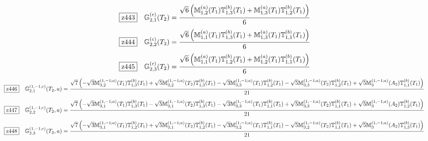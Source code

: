 \documentclass[fleqn,10pt,landscape]{jsarticle}
\begin{document}
\begin{dmath*}
\hspace*{3mm}\fbox{z443}\quad \mathbb{G}_{2,1}^{(c)}(T_{2})=\frac{\sqrt{6} \left(\mathbb{M}_{1,2}^{(a)}(T_{1}) \mathbb{T}_{1,3}^{(b)}(T_{1}) + \mathbb{M}_{1,3}^{(a)}(T_{1}) \mathbb{T}_{1,2}^{(b)}(T_{1})\right)}{6}
\end{dmath*}
\begin{dmath*}
\hspace*{3mm}\fbox{z444}\quad \mathbb{G}_{2,2}^{(c)}(T_{2})=\frac{\sqrt{6} \left(\mathbb{M}_{1,1}^{(a)}(T_{1}) \mathbb{T}_{1,3}^{(b)}(T_{1}) + \mathbb{M}_{1,3}^{(a)}(T_{1}) \mathbb{T}_{1,1}^{(b)}(T_{1})\right)}{6}
\end{dmath*}
\begin{dmath*}
\hspace*{3mm}\fbox{z445}\quad \mathbb{G}_{2,3}^{(c)}(T_{2})=\frac{\sqrt{6} \left(\mathbb{M}_{1,1}^{(a)}(T_{1}) \mathbb{T}_{1,2}^{(b)}(T_{1}) + \mathbb{M}_{1,2}^{(a)}(T_{1}) \mathbb{T}_{1,1}^{(b)}(T_{1})\right)}{6}
\end{dmath*}
\begin{dmath*}
\hspace*{3mm}\fbox{z446}\quad \mathbb{G}_{2,1}^{(1,-1;c)}(T_{2},a)=\frac{\sqrt{7} \left(- \sqrt{3} \mathbb{M}_{3,2}^{(1,-1;a)}(T_{1}) \mathbb{T}_{1,3}^{(b)}(T_{1}) + \sqrt{5} \mathbb{M}_{3,2}^{(1,-1;a)}(T_{2}) \mathbb{T}_{1,3}^{(b)}(T_{1}) - \sqrt{3} \mathbb{M}_{3,3}^{(1,-1;a)}(T_{1}) \mathbb{T}_{1,2}^{(b)}(T_{1}) - \sqrt{5} \mathbb{M}_{3,3}^{(1,-1;a)}(T_{2}) \mathbb{T}_{1,2}^{(b)}(T_{1}) + \sqrt{5} \mathbb{M}_{3}^{(1,-1;a)}(A_{2}) \mathbb{T}_{1,1}^{(b)}(T_{1})\right)}{21}
\end{dmath*}
\begin{dmath*}
\hspace*{3mm}\fbox{z447}\quad \mathbb{G}_{2,2}^{(1,-1;c)}(T_{2},a)=\frac{\sqrt{7} \left(- \sqrt{3} \mathbb{M}_{3,1}^{(1,-1;a)}(T_{1}) \mathbb{T}_{1,3}^{(b)}(T_{1}) - \sqrt{5} \mathbb{M}_{3,1}^{(1,-1;a)}(T_{2}) \mathbb{T}_{1,3}^{(b)}(T_{1}) - \sqrt{3} \mathbb{M}_{3,3}^{(1,-1;a)}(T_{1}) \mathbb{T}_{1,1}^{(b)}(T_{1}) + \sqrt{5} \mathbb{M}_{3,3}^{(1,-1;a)}(T_{2}) \mathbb{T}_{1,1}^{(b)}(T_{1}) + \sqrt{5} \mathbb{M}_{3}^{(1,-1;a)}(A_{2}) \mathbb{T}_{1,2}^{(b)}(T_{1})\right)}{21}
\end{dmath*}
\begin{dmath*}
\hspace*{3mm}\fbox{z448}\quad \mathbb{G}_{2,3}^{(1,-1;c)}(T_{2},a)=\frac{\sqrt{7} \left(- \sqrt{3} \mathbb{M}_{3,1}^{(1,-1;a)}(T_{1}) \mathbb{T}_{1,2}^{(b)}(T_{1}) + \sqrt{5} \mathbb{M}_{3,1}^{(1,-1;a)}(T_{2}) \mathbb{T}_{1,2}^{(b)}(T_{1}) - \sqrt{3} \mathbb{M}_{3,2}^{(1,-1;a)}(T_{1}) \mathbb{T}_{1,1}^{(b)}(T_{1}) - \sqrt{5} \mathbb{M}_{3,2}^{(1,-1;a)}(T_{2}) \mathbb{T}_{1,1}^{(b)}(T_{1}) + \sqrt{5} \mathbb{M}_{3}^{(1,-1;a)}(A_{2}) \mathbb{T}_{1,3}^{(b)}(T_{1})\right)}{21}
\end{dmath*}
\end{document}
